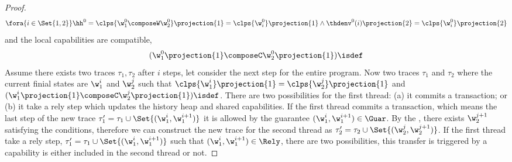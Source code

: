 \begin{proof}
\[ 
    \fora{i \in \Set{1,2}} 
    \hh^{0} = \clps{\w_{1}^{0} \composeW \w_{2}^{0}}\projection{1} = \clps{\w_{i}^{0}}\projection{1}
    \land \thdenv^{0}(i)\projection{2} = \clps{\w_{i}^{0}}\projection{2}
\]
and the local capabilities are compatible,
\[ 
    (\w_{1}^{0}\projection{1} \composeC \w_{2}^{0}\projection{1})\isdef 
\]
Assume there exists two traces \( \tau_{1}, \tau_{2}\) after \( i \) steps, let consider the next step for the entire program.
Now two traces \( \tau_{1}\) and \( \tau_{2} \) where the current finial states are \( \w_{1}^{i} \) and \( \w_{2}^{j} \) such that \( \clps{\w_{1}^{i}}\projection{1} = \clps{\w_{2}^{j}}\projection{1} \) and \( (\w_{1}^{i}\projection{1} \composeC \w_{2}^{j}\projection{1})\isdef \).
There are two possibilities for the first thread: (a) it commits a transaction; or (b) it take a rely step which updates the history heap and shared capabilities.
If the first thread commits a transaction, which means the last step of the new trace \( \tau_{1}' = \tau_{1} \cup \Set{(\w_{1}^{i}, \w_{1}^{i+1})} \) it is allowed by the guarantee \( (\w_{1}^{i}, \w_{1}^{i+1}) \in \Guar \).
By the , there exists \( \w_{2}^{j+1} \) satisfying the conditions, therefore we can construct the new trace for the second thread as \( \tau_{2}' = \tau_{2} \cup \Set{(\w_{2}^{j},\w_{2}^{j+1})} \).
If the first thread take a rely step, \ie \( \tau_{1}' = \tau_{1} \cup \Set{(\w_{1}^{i}, \w_{1}^{i+1})} \) such that \( (\w_{1}^{i}, \w_{1}^{i+1}) \in \Rely \), there are two possibilities, this transfer is triggered by a capability is either included in the second thread or not.


\end{proof}

